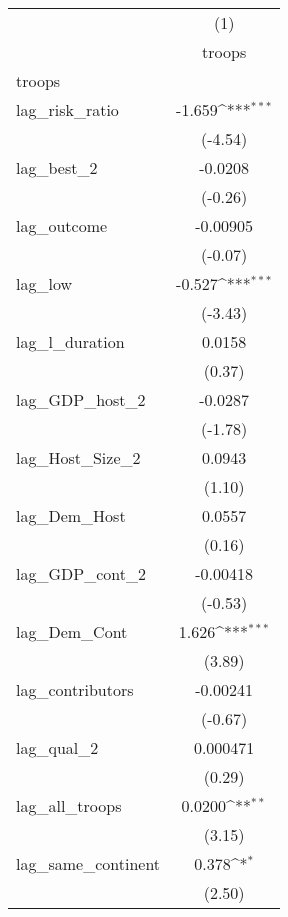 {
\def\sym#1{\ifmmode^{#1}\else\(^{#1}\)\fi}
\begin{tabular}{l*{1}{c}}
\hline\hline
            &\multicolumn{1}{c}{(1)}\\
            &\multicolumn{1}{c}{troops}\\
\hline
troops      &                     \\
lag\_risk\_ratio&      -1.659\sym{***}\\
            &     (-4.54)         \\
[1em]
lag\_best\_2  &     -0.0208         \\
            &     (-0.26)         \\
[1em]
lag\_outcome &    -0.00905         \\
            &     (-0.07)         \\
[1em]
lag\_low     &      -0.527\sym{***}\\
            &     (-3.43)         \\
[1em]
lag\_l\_duration&      0.0158         \\
            &      (0.37)         \\
[1em]
lag\_GDP\_host\_2&     -0.0287         \\
            &     (-1.78)         \\
[1em]
lag\_Host\_Size\_2&      0.0943         \\
            &      (1.10)         \\
[1em]
lag\_Dem\_Host&      0.0557         \\
            &      (0.16)         \\
[1em]
lag\_GDP\_cont\_2&    -0.00418         \\
            &     (-0.53)         \\
[1em]
lag\_Dem\_Cont&       1.626\sym{***}\\
            &      (3.89)         \\
[1em]
lag\_contributors&    -0.00241         \\
            &     (-0.67)         \\
[1em]
lag\_qual\_2  &    0.000471         \\
            &      (0.29)         \\
[1em]
lag\_all\_troops&      0.0200\sym{**} \\
            &      (3.15)         \\
[1em]
lag\_same\_continent&       0.378\sym{*}  \\
            &      (2.50)         \\

\end{tabular}}
